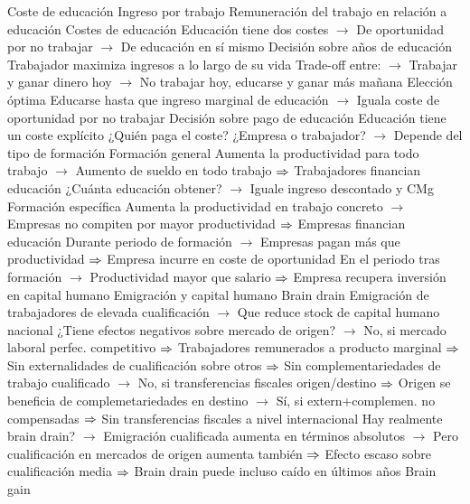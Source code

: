 \documentclass{nuevotema}
\begin{document}
\begin{esquemal}
				\4[] Coste de educación
				\4[] Ingreso por trabajo
				\4[] Remuneración del trabajo en relación a educación
				\4 Costes de educación
				\4[] Educación tiene dos costes
				\4[] $\to$ De oportunidad por no trabajar
				\4[] $\to$ De educación en sí mismo
			\3 Decisión sobre años de educación
				\4 Trabajador maximiza ingresos a lo largo de su vida
				\4 Trade-off entre:
				\4[] $\to$ Trabajar y ganar dinero hoy
				\4[] $\to$ No trabajar hoy, educarse y ganar más mañana
				\4 Elección óptima
				\4[] Educarse hasta que ingreso marginal de educación
				\4[] $\to$ Iguala coste de oportunidad por no trabajar
			\3 Decisión sobre pago de educación
				\4 Educación tiene un coste explícito
				\4 ¿Quién paga el coste?
				\4[] ¿Empresa o trabajador?
				\4[] $\to$ Depende del tipo de formación
				\4 Formación general
				\4[] Aumenta la productividad para todo trabajo
				\4[] $\to$ Aumento de sueldo en todo trabajo
				\4[] $\Rightarrow$ Trabajadores financian educación
				\4[] ¿Cuánta educación obtener?
				\4[] $\to$ Iguale ingreso descontado y CMg
				\4 Formación específica
				\4[] Aumenta la productividad en trabajo concreto
				\4[] $\to$ Empresas no compiten por mayor productividad
				\4[] $\Rightarrow$ Empresas financian educación
				\4[] Durante periodo de formación
				\4[] $\to$ Empresas pagan más que productividad
				\4[] $\Rightarrow$ Empresa incurre en coste de oportunidad
				\4[] En el periodo tras formación
				\4[] $\to$ Productividad mayor que salario
				\4[] $\Rightarrow$ Empresa recupera inversión en capital humano
			\3 Emigración y capital humano
				\4 Brain drain
				\4[] Emigración de trabajadores de elevada cualificación
				\4[] $\to$ Que reduce stock de capital humano nacional
				\4[] ¿Tiene efectos negativos sobre mercado de origen?
				\4[] $\to$ No, si mercado laboral perfec. competitivo
				\4[] $\Rightarrow$ Trabajadores remunerados a producto marginal
				\4[] $\Rightarrow$ Sin externalidades de cualificación sobre otros
				\4[] $\Rightarrow$ Sin complementariedades de trabajo cualificado
				\4[] $\to$ No, si transferencias fiscales origen/destino
				\4[] $\Rightarrow$ Origen se beneficia de complemetariedades en destino
				\4[] $\to$ Sí, si extern+complemen. no compensadas
				\4[] $\Rightarrow$ Sin transferencias fiscales a nivel internacional
				\4[] Hay realmente brain drain?
				\4[] $\to$ Emigración cualificada aumenta en términos absolutos
				\4[] $\to$ Pero cualificación en mercados de origen aumenta también
				\4[] $\Rightarrow$ Efecto escaso sobre cualificación media
				\4[] $\Rightarrow$ Brain drain puede incluso caído en últimos años
				\4 Brain gain

\end{esquemal}
\end{document}
